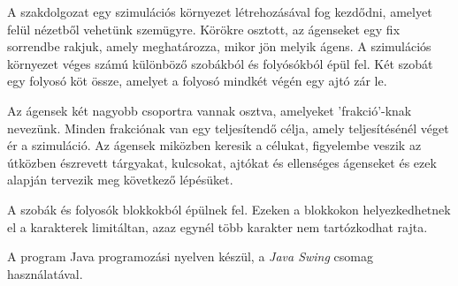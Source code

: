 
A szakdolgozat egy szimulációs környezet létrehozásával fog kezdődni, amelyet felül nézetből vehetünk szemügyre.
Körökre osztott, az ágenseket egy fix sorrendbe rakjuk, amely meghatározza, mikor jön melyik ágens.
A szimulációs környezet véges számú különböző szobákból és folyósókból épül fel. Két szobát egy folyosó köt össze, amelyet a folyosó mindkét végén egy ajtó zár le. 

Az ágensek két nagyobb csoportra vannak osztva, amelyeket 'frakció'-knak nevezünk. Minden frakciónak van egy teljesítendő célja, amely teljesítésénél véget ér a szimuláció.
Az ágensek miközben keresik a célukat, figyelembe veszik az útközben észrevett tárgyakat, kulcsokat, ajtókat és ellenséges ágenseket és ezek alapján tervezik meg következő lépésüket.

A szobák és folyosók blokkokból épülnek fel. Ezeken a blokkokon helyezkedhetnek el a karakterek limitáltan, azaz egynél több karakter nem tartózkodhat rajta.

A program Java programozási nyelven \cite{arnold2005java} készül, a \textit{Java Swing} csomag \cite{10.5555/291162} használatával.